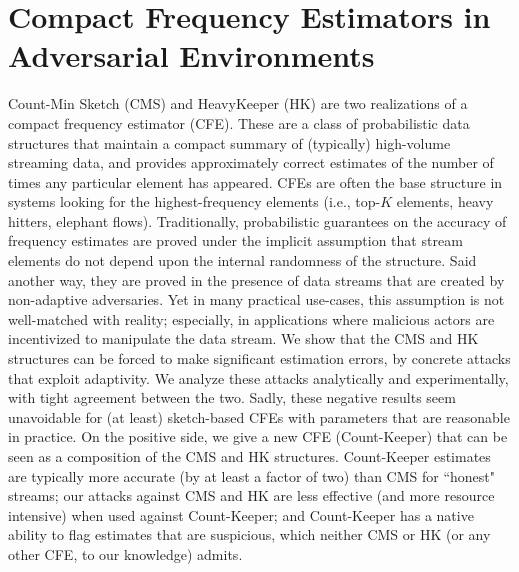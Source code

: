 \chapter{Compact Frequency Estimators in Adversarial Environments}

Count-Min Sketch (CMS) and HeavyKeeper (HK) are two realizations of a compact frequency estimator (CFE).  These are a class of probabilistic data structures that maintain a compact summary of (typically) high-volume streaming data, and provides approximately correct estimates of the number of times any particular element has appeared. CFEs are often the base structure in systems looking for the highest-frequency elements (i.e., top-$K$ elements, heavy hitters, elephant flows).  Traditionally, probabilistic guarantees on the accuracy of frequency estimates are proved under the implicit assumption that stream elements do not depend upon the internal randomness of the structure. Said another way, they are proved in the presence of data streams that are created by non-adaptive adversaries.  Yet in many practical use-cases, this assumption is not well-matched with reality; especially, in applications where malicious actors are incentivized to manipulate the data stream.  We show that the CMS and HK structures can be forced to make significant estimation errors, by concrete attacks that exploit adaptivity.  We analyze these attacks analytically and experimentally, with tight agreement between the two.  Sadly, these negative results seem unavoidable for (at least) sketch-based CFEs with parameters that are reasonable in practice. On the positive side, we give a new CFE (Count-Keeper) that can be seen as a composition of the CMS and HK structures. Count-Keeper estimates are typically more accurate (by at least a factor of two) than CMS for ``honest" streams; our attacks against CMS and HK are less effective (and more resource intensive) when used against Count-Keeper; and Count-Keeper has a native ability to flag estimates that are suspicious, which neither CMS or HK (or any other CFE, to our knowledge) admits.

